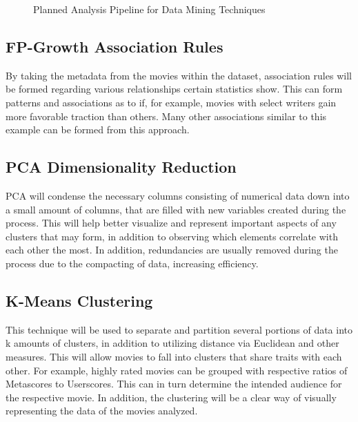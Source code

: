 \documentclass[conference]{IEEEtran}
\begin{document}
\begin{figure}[htbp]
    \centering
    \caption{Planned Analysis Pipeline for Data Mining Techniques}
    \label{fig:pipeline}
\end{figure}

\subsection{FP-Growth Association Rules}\label{AA}
By taking the metadata from the movies within the dataset, association rules will be formed regarding various relationships certain statistics show. This can form patterns and associations as to if, for example, movies with select writers gain more favorable traction than others. Many other associations similar to this example can be formed from this approach.
\subsection{PCA Dimensionality Reduction}
PCA will condense the necessary columns consisting of numerical data down into a small amount of columns, that are filled with new variables created during the process. This will help better visualize and represent important aspects of any clusters that may form, in addition to observing which elements correlate with each other the most. In addition, redundancies are usually removed during the process due to the compacting of data, increasing efficiency.
\subsection{K-Means Clustering}
This technique will be used to separate and partition several portions of data into k amounts of clusters, in addition to utilizing distance via Euclidean and other measures. This will allow movies to fall into clusters that share traits with each other. For example, highly rated movies can be grouped with respective ratios of Metascores to Userscores. This can in turn determine the intended audience for the respective movie. In addition, the clustering will be a clear way of visually representing the data of the movies analyzed.
\end{document}

